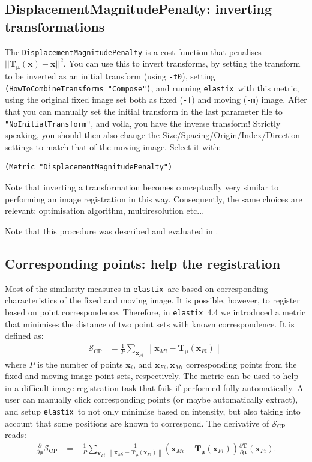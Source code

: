 \documentclass[]{report}
\newcommand{\elastix}{\texttt{elastix}}
\newcommand{\vx}{\bm{x}}
\newcommand{\vmu}{\bm{\mu}}
\newcommand{\vT}{\bm{T}}
\newcommand{\vTm}{\bm{T}_{\vmu}}
\newcommand{\Sim}{\mathcal{S}}
\begin{document}
\subsection{DisplacementMagnitudePenalty: inverting transformations}

The \texttt{DisplacementMagnitudePenalty} is a cost function that penalises
$||\vTm(\vx)-\vx||^2$. You can use this to invert transforms, by setting the
transform to be inverted as an initial transform (using \texttt{-t0}), setting
\texttt{(HowToCombineTransforms "Compose")}, and running \elastix\ with this
metric, using the original fixed image set both as fixed (\texttt{-f}) and
moving (\texttt{-m}) image. After that you can manually set the initial
transform in the last parameter file to \texttt{"NoInitialTransform"}, and
voila, you have the inverse transform! Strictly speaking, you should then also
change the Size/Spacing/Origin/Index/Direction settings to match that of the
moving image. Select it with: \small
\begin{verbatim}
(Metric "DisplacementMagnitudePenalty")
\end{verbatim}
\normalsize Note that inverting a transformation becomes conceptually very
similar to performing an image registration in this way. Consequently, the same
choices are relevant: optimisation algorithm, multiresolution etc...

Note that this procedure was described and evaluated in \cite{Metz11}.

\subsection{Corresponding points: help the registration}

Most of the similarity measures in \elastix\ are based on corresponding
characteristics of the fixed and moving image. It is possible, however, to
register based on point correspondence. Therefore, in \elastix\ 4.4 we
introduced a metric that minimises the distance of two point sets with known
correspondence. It is defined as:
\begin{align}
\Sim_{\mathrm{CP}} &= \frac{1}{P} \sum_{\vx_{Fi}} \left\| \vx_{Mi} -
\vTm(\vx_{Fi}) \right\|
\end{align}
where $P$ is the number of points $\vx_i$, and $\vx_{Fi}, \vx_{Mi}$
corresponding points from the fixed and moving image point sets, respectively.
The metric can be used to help in a difficult image registration task that
fails if performed fully automatically. A user can manually click corresponding
points (or maybe automatically extract), and setup \elastix\ to not only
minimise based on intensity, but also taking into account that some positions
are known to correspond. The derivative of $\Sim_{\mathrm{CP}}$ reads:
\begin{align}
\frac{\partial}{\partial \vmu} \Sim_{\mathrm{CP}} &= -\frac{1}{P}
\sum_{\vx_{Fi}} \frac{1}{\left\| \vx_{Mi} - \vTm(\vx_{Fi})
\right\|} \left( \vx_{Mi} - \vTm(\vx_{Fi}) \right) \frac{\partial
\vT}{\partial \vmu}(\vx_{Fi}).
\end{align}
\end{document}
